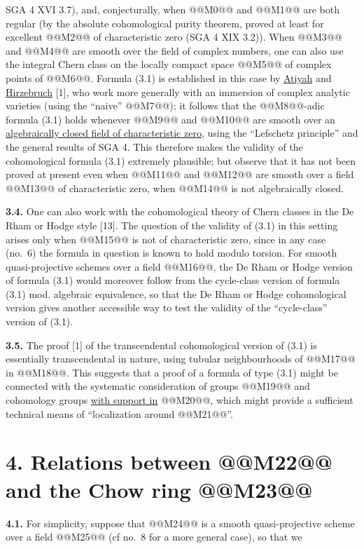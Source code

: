 SGA 4 XVI 3.7), and, conjecturally, when @@M0@@ and @@M1@@ are both regular (by the absolute cohomological purity theorem, proved at least for excellent @@M2@@ of characteristic zero (SGA 4 XIX 3.2)). When @@M3@@ and @@M4@@ are smooth over the field of complex numbers, one can also use the integral Chern class on the locally compact space @@M5@@ of complex points of @@M6@@. Formula (3.1) is established in this case by \uline{Atiyah} and \uline{Hirzebruch} [1], who work more generally with an immersion of complex analytic varieties (using the ``naive'' @@M7@@); it follows that the @@M8@@-adic formula (3.1) holds whenever @@M9@@ and @@M10@@ are smooth over an \uline{algebraically closed field of characteristic zero}, using the ``Lefschetz principle'' and the general results of SGA 4. This therefore makes the validity of the cohomological formula (3.1) extremely plausible; but observe that it has not been proved at present even when @@M11@@ and @@M12@@ are smooth over a field @@M13@@ of characteristic zero, when @@M14@@ is not algebraically closed.

\textbf{3.4.} One can also work with the cohomological theory of Chern classes in the De Rham or Hodge style [13]. The question of the validity of (3.1) in this setting arises only when @@M15@@ is not of characteristic zero, since in any case (no.~6) the formula in question is known to hold modulo torsion. For smooth quasi-projective schemes over a field @@M16@@, the De Rham or Hodge version of formula (3.1) would moreover follow from the cycle-class version of formula (3.1) mod. algebraic equivalence, so that the De Rham or Hodge cohomological version gives another accessible way to test the validity of the ``cycle-class'' version of (3.1).

\textbf{3.5.} The proof [1] of the transcendental cohomological version of (3.1) is essentially transcendental in nature, using tubular neighbourhoods of @@M17@@ in @@M18@@. This suggests that a proof of a formula of type (3.1) might be connected with the systematic consideration of groups @@M19@@ and cohomology groups \uline{with support in} @@M20@@, which might provide a sufficient technical means of ``localization around @@M21@@''.

\section*{4. Relations between @@M22@@ and the Chow ring @@M23@@}

\textbf{4.1.} For simplicity, suppose that @@M24@@ is a smooth quasi-projective scheme over a field @@M25@@ (cf no.~8 for a more general case), so that we
